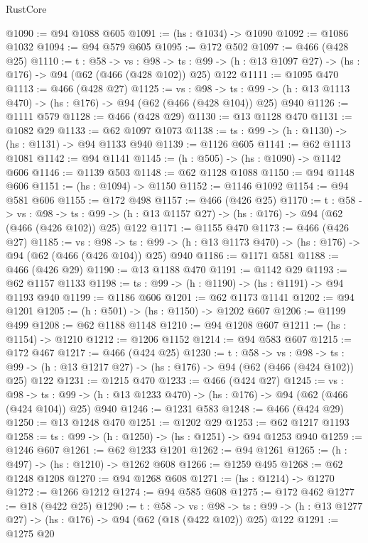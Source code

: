 \begin{lexlean}{RustCore}
\begin{coremodule}
@1090 := @94 @1088 @605
@1091 := (hs : @1034) -> @1090
@1092 := @1086 @1032
@1094 := @94 @579 @605
@1095 := @172 @502
@1097 := @466 (@428 @25)
@1110 := {t : @58} ->
  {vs : @98} ->
  {ts : @99} -> (h : @13 @1097 @27) -> (hs : @176) -> @94 (@62 (@466 (@428 @102)) @25) @122
@1111 := @1095 @470
@1113 := @466 (@428 @27)
@1125 := {vs : @98} ->
  {ts : @99} -> (h : @13 @1113 @470) -> (hs : @176) -> @94 (@62 (@466 (@428 @104)) @25) @940
@1126 := @1111 @579
@1128 := @466 (@428 @29)
@1130 := @13 @1128 @470
@1131 := @1082 @29
@1133 := @62 @1097 @1073
@1138 := {ts : @99} -> (h : @1130) -> (hs : @1131) -> @94 @1133 @940
@1139 := @1126 @605
@1141 := @62 @1113 @1081
@1142 := @94 @1141
@1145 := (h : @505) -> (hs : @1090) -> @1142 @606
@1146 := @1139 @503
@1148 := @62 @1128 @1088
@1150 := @94 @1148 @606
@1151 := (hs : @1094) -> @1150
@1152 := @1146 @1092
@1154 := @94 @581 @606
@1155 := @172 @498
@1157 := @466 (@426 @25)
@1170 := {t : @58} ->
  {vs : @98} ->
  {ts : @99} -> (h : @13 @1157 @27) -> (hs : @176) -> @94 (@62 (@466 (@426 @102)) @25) @122
@1171 := @1155 @470
@1173 := @466 (@426 @27)
@1185 := {vs : @98} ->
  {ts : @99} -> (h : @13 @1173 @470) -> (hs : @176) -> @94 (@62 (@466 (@426 @104)) @25) @940
@1186 := @1171 @581
@1188 := @466 (@426 @29)
@1190 := @13 @1188 @470
@1191 := @1142 @29
@1193 := @62 @1157 @1133
@1198 := {ts : @99} -> (h : @1190) -> (hs : @1191) -> @94 @1193 @940
@1199 := @1186 @606
@1201 := @62 @1173 @1141
@1202 := @94 @1201
@1205 := (h : @501) -> (hs : @1150) -> @1202 @607
@1206 := @1199 @499
@1208 := @62 @1188 @1148
@1210 := @94 @1208 @607
@1211 := (hs : @1154) -> @1210
@1212 := @1206 @1152
@1214 := @94 @583 @607
@1215 := @172 @467
@1217 := @466 (@424 @25)
@1230 := {t : @58} ->
  {vs : @98} ->
  {ts : @99} -> (h : @13 @1217 @27) -> (hs : @176) -> @94 (@62 (@466 (@424 @102)) @25) @122
@1231 := @1215 @470
@1233 := @466 (@424 @27)
@1245 := {vs : @98} ->
  {ts : @99} -> (h : @13 @1233 @470) -> (hs : @176) -> @94 (@62 (@466 (@424 @104)) @25) @940
@1246 := @1231 @583
@1248 := @466 (@424 @29)
@1250 := @13 @1248 @470
@1251 := @1202 @29
@1253 := @62 @1217 @1193
@1258 := {ts : @99} -> (h : @1250) -> (hs : @1251) -> @94 @1253 @940
@1259 := @1246 @607
@1261 := @62 @1233 @1201
@1262 := @94 @1261
@1265 := (h : @497) -> (hs : @1210) -> @1262 @608
@1266 := @1259 @495
@1268 := @62 @1248 @1208
@1270 := @94 @1268 @608
@1271 := (hs : @1214) -> @1270
@1272 := @1266 @1212
@1274 := @94 @585 @608
@1275 := @172 @462
@1277 := @18 (@422 @25)
@1290 := {t : @58} ->
  {vs : @98} ->
  {ts : @99} -> (h : @13 @1277 @27) -> (hs : @176) -> @94 (@62 (@18 (@422 @102)) @25) @122
@1291 := @1275 @20

\end{coremodule}
\end{lexlean}
